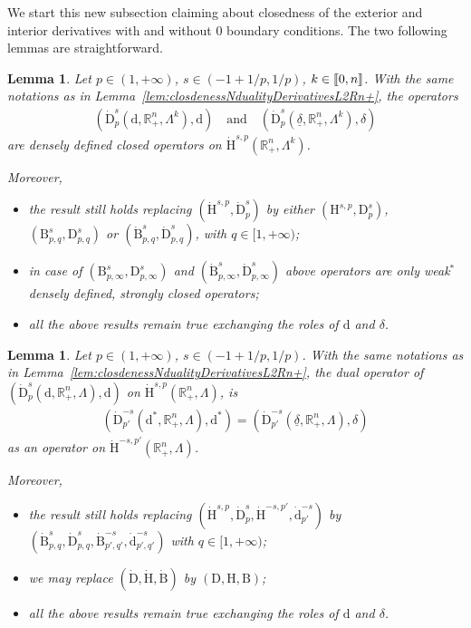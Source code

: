 \documentclass[10pt]{amsart}
\newtheorem{lemm}[theo]{Lemma}\newtheorem{prop}[theo]{Proposition}\newtheorem{coro}[theo]{Corollary}\newtheorem{conj}[theo]{Conjecture}
\theoremstyle{definition}\newtheorem{defi}[theo]{Definition}\newtheorem{rema}[theo]{Remark}\newtheorem{exam}[theo]{Example}\newtheorem{exem}[theo]{Example}\newtheorem{nota}[theo]{Notation}
\newcommand{\bbR}{\mathbb{R}}
\newcommand{\rmH}{\mathrm{H}}%
\newcommand{\rmB}{\mathrm{B}}
\newcommand{\rmd}{\mathrm{d}}
\newcommand{\rmD}{\mathrm{D}}
\newcommand{\llbracket}{\mathopen{[\mkern -2.7mu[}}
\newcommand{\rrbracket}{\mathclose{]\mkern -2.7mu]}}
\newcommand{\llb}{\llbracket}
\newcommand{\rrb}{\rrbracket}
\begin{document}
We start this new subsection claiming about closedness of the exterior and interior derivatives with and without $0$ boundary conditions. The two following lemmas are straightforward.

\begin{lemm}
Let $p\in(1,+\infty)$, $s\in(-1+1/p,1/p)$, $k\in\llb 0,n \rrb$. With the same notations as in Lemma~\ref{lem:closdenessNdualityDerivativesL2Rn+}, the operators
\begin{align*}
\left(\dot{\rmD}^{s}_{p}\left(\rmd,\bbR^n_+,\Lambda^k\right),\rmd\right)\quad \text{and}\quad \left(\dot{\rmD}^{s}_{p}\left(\underline{\delta},\bbR^n_+,\Lambda^k\right),{\delta}\right)
\end{align*}
are densely defined closed operators on $\dot{\rmH}^{s,p}(\bbR^n_+,\Lambda^k)$.

Moreover,
\begin{itemize}
\item the result still holds replacing $(\dot{\rmH}^{s,p},\dot{\rmD}^{s}_{p})$ by either $({\rmH}^{s,p},{\rmD}^{s}_{p})$, $(\rmB^{s}_{p,q},\rmD^{s}_{p,q})$ or $(\dot{\rmB}^{s}_{p,q},\dot{\rmD}^{s}_{p,q})$, with $q\in[1,+\infty)$;

\item in case of $(\rmB^{s}_{p,\infty},\rmD^{s}_{p,\infty})$ and $(\dot{\rmB}^{s}_{p,\infty},\dot{\rmD}^{s}_{p,\infty})$ above operators are only weak${}^\ast$ densely defined, strongly closed operators;

\item all the above results remain true exchanging the roles of $\rmd$ and $\delta$.
\end{itemize}
\end{lemm}


\begin{lemm}
Let $p\in(1,+\infty)$, $s\in(-1+1/p,1/p)$. With the same notations as in Lemma~\ref{lem:closdenessNdualityDerivativesL2Rn+}, the dual operator of $(\dot{\rmD}^{s}_{p}(\rmd,\bbR^n_+,\Lambda),\rmd)$ on $\dot{\rmH}^{s,p}(\bbR^n_+,\Lambda)$, is
\begin{align*}
\left(\dot{\rmD}^{-s}_{p'}\left({\rmd}^\ast,\bbR^n_+,\Lambda\right),{\rmd}^\ast\right) = \left(\dot{\rmD}^{-s}_{p'}\left(\underline{\delta},\bbR^n_+,\Lambda\right),{\delta}\right)
\end{align*}
as an operator on $\dot{\rmH}^{-s,p'}(\bbR^n_+,\Lambda)$.

Moreover,
\begin{itemize}
\item the result still holds replacing $(\dot{\rmH}^{s,p},\dot{\rmD}^{s}_{p},\dot{\rmH}^{-s,p'},\dot{\rmd}^{-s}_{p'})$ by $(\dot{\rmB}^{s}_{p,q},\dot{\rmD}^{s}_{p,q},\dot{\rmB}^{-s}_{p',q'},\dot{\rmd}^{-s}_{p',q'})$ with $q\in[1,+\infty)$;

\item we may replace $(\dot{\rmD},\dot{\rmH},\dot{\rmB})$ by $(\rmD,\rmH,\rmB)$;

\item all the above results remain true exchanging the roles of $\rmd$ and $\delta$.
\end{itemize}
\end{lemm}
\end{document}

